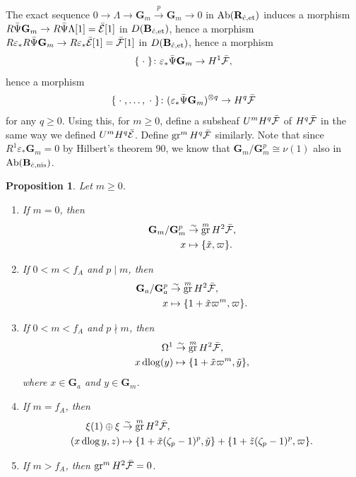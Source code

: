 \documentclass{amsart}
\newtheorem{Prop}[Thm]{Proposition}
\theoremstyle{remark}
\numberwithin{equation}{subsection}
\newcommand{\isomto}{\overset{\sim}{\to}}
\newcommand{\tensor}{\mathbin{\otimes}}
\newcommand{\et}{\mathrm{et}}
\newcommand{\Gm}{\mathbf{G}_{m}}
\newcommand{\Ga}{\mathbf{G}_{a}}
\newcommand{\alg}[1]{\mathbf{#1}}
\newcommand{\var}{\;\cdot\;}
\newcommand{\nis}{\mathrm{nis}}
\DeclareMathOperator{\Ab}{Ab}
\DeclareMathOperator{\gr}{gr}
\DeclareMathOperator{\dlog}{dlog}
\begin{document}
The exact sequence
$0 \to \Lambda \to \Gm \stackrel{p}{\to} \Gm \to 0$
in $\Ab(\alg{R}_{\Hat{c}, \et})$ induces a morphism
	$
			R \Bar{\Psi} \Gm
		\to
			R \Bar{\Psi} \Lambda[1]
		=
			\Bar{\mathcal{E}}[1]
	$
in $D(\alg{B}_{\Hat{c}, \et})$, hence a morphism
	$
			R \varepsilon_{\ast} R \Bar{\Psi} \Gm
		\to
			R \varepsilon_{\ast} \Bar{\mathcal{E}}[1]
		=
			\Bar{\mathcal{F}}[1]
	$
in $D(\alg{B}_{\Hat{c}, \et})$, hence a morphism
	\[
			\{\var\}
		\colon
			\varepsilon_{\ast} \Bar{\Psi} \Gm
		\to
			H^{1} \Bar{\mathcal{F}},
	\]
hence a morphism
	\[
			\{\var, \dots, \var\}
		\colon
			(\varepsilon_{\ast} \Bar{\Psi} \Gm)^{\tensor q}
		\to
			H^{q} \Bar{\mathcal{F}}
	\]
for any $q \ge 0$.
Using this, for $m \ge 0$,
define a subsheaf $U^{m} H^{q} \Bar{\mathcal{F}}$ of $H^{q} \Bar{\mathcal{F}}$
in the same way we defined $U^{m} H^{q} \Bar{\mathcal{E}}$.
Define $\gr^{m} H^{q} \Bar{\mathcal{F}}$ similarly.
Note that since $R^{1} \varepsilon_{\ast} \Gm = 0$ by Hilbert's theorem 90,
we know that $\Gm / \Gm^{p} \cong \nu(1)$ also in $\Ab(\alg{B}_{\Hat{c}, \nis})$.

\begin{Prop} \label{0100}
	Let $m \ge 0$.
	\begin{enumerate}
		\item \label{0251}
			If $m = 0$, then
				\begin{align*}
							\Gm / \Gm^{p}
					&	\isomto
							\gr^{m} H^{2} \Bar{\mathcal{F}},
					\\
							x
					&	\mapsto
							\{\Tilde{x}, \varpi\}.
				\end{align*}
		\item \label{0252}
			If $0 < m < f_{A}$ and $p \mid m$, then
				\begin{align*}
							\Ga / \Ga^{p}
					&	\isomto
							\gr^{m} H^{2} \Bar{\mathcal{F}},
					\\
							x
					&	\mapsto
							\{1 + \Tilde{x} \varpi^{m}, \varpi\}.
				\end{align*}
		\item \label{0253}
			If $0 < m < f_{A}$ and $p \nmid m$, then
				\begin{align*}
							\Omega^{1}
					&	\isomto
							\gr^{m} H^{2} \Bar{\mathcal{F}},
					\\
							x \dlog(y)
					&	\mapsto
							\{1 + \Tilde{x} \varpi^{m}, \Tilde{y}\},
				\end{align*}
			where $x \in \Ga$ and $y \in \Gm$.
		\item \label{0254}
			If $m = f_{A}$, then
				\begin{align*}
							\xi(1) \oplus \xi
					&	\isomto
							\gr^{m} H^{2} \Bar{\mathcal{F}},
					\\
							(x \dlog y, z)
					&	\mapsto
								\{1 + \Tilde{x} (\zeta_{p} - 1)^{p}, \Tilde{y}\}
							+
								\{1 + \Tilde{z} (\zeta_{p} - 1)^{p}, \varpi\}.
				\end{align*}
		\item \label{0255}
			If $m > f_{A}$, then $\gr^{m} H^{2} \Bar{\mathcal{F}} = 0$.
	\end{enumerate}
\end{Prop}
\end{document}
